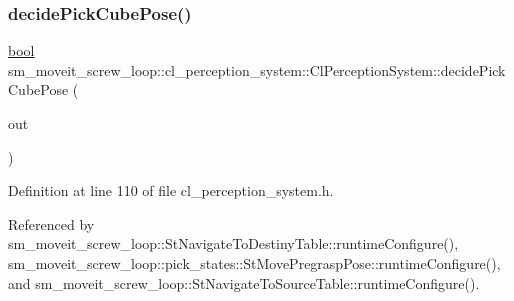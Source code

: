 \subsubsection{\texorpdfstring{decide\+Pick\+Cube\+Pose()}{decidePickCubePose()}}
{\footnotesize\ttfamily \hyperlink{classbool}{bool} sm\+\_\+moveit\+\_\+screw\+\_\+loop\+::cl\+\_\+perception\+\_\+system\+::\+Cl\+Perception\+System\+::decide\+Pick\+Cube\+Pose (\begin{DoxyParamCaption}\item[{geometry\+\_\+msgs\+::\+Pose\+Stamped \&}]{out }\end{DoxyParamCaption})\hspace{0.3cm}{\ttfamily [inline]}}



Definition at line 110 of file cl\+\_\+perception\+\_\+system.\+h.



Referenced by sm\+\_\+moveit\+\_\+screw\+\_\+loop\+::\+St\+Navigate\+To\+Destiny\+Table\+::runtime\+Configure(), sm\+\_\+moveit\+\_\+screw\+\_\+loop\+::pick\+\_\+states\+::\+St\+Move\+Pregrasp\+Pose\+::runtime\+Configure(), and sm\+\_\+moveit\+\_\+screw\+\_\+loop\+::\+St\+Navigate\+To\+Source\+Table\+::runtime\+Configure().


